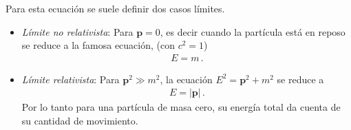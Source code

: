 \begin{frame}
Para esta ecuación se suele definir dos casos límites.
\begin{itemize}
\item \emph{Límite no relativista}: Para $\mathbf{p}=0$, es decir cuando la partícula está en reposo se reduce a la famosa ecuación, (con $c^2=1$)
  \begin{align}
    E=m\,.
  \end{align}

\item \emph{Límite relativista}: Para $\mathbf{p}^2\gg m^2$, la ecuación $E^2=\mathbf{p}^2+m^2$ se reduce a
  \begin{align}
    E= |\mathbf{p}|\,.
  \end{align}
Por lo tanto para una partícula de masa cero, su energía total da cuenta de su cantidad de movimiento.
\end{itemize}

\end{frame}

